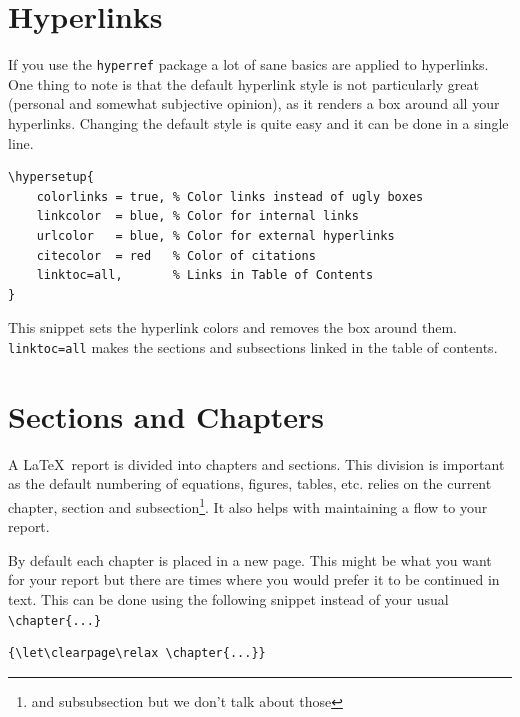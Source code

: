 \documentclass[english,10pt,a4paper, openany, oneside]{book}
\begin{document}
		\section{Hyperlinks}
		\begingroup
		If you use the \texttt{hyperref} package a lot of sane basics are applied to hyperlinks. One thing to note is that the default hyperlink style is not particularly great (personal and somewhat subjective opinion), as it renders a box around all your hyperlinks. Changing the default style is quite easy and it can be done in a single line. 
		\endgroup
		\begin{lstlisting}[style=mystyle]
\hypersetup{
	colorlinks = true, % Color links instead of ugly boxes
	linkcolor  = blue, % Color for internal links
	urlcolor   = blue, % Color for external hyperlinks
	citecolor  = red   % Color of citations
	linktoc=all,       % Links in Table of Contents
}\end{lstlisting}
		This snippet sets the hyperlink colors and removes the box around them. \texttt{linktoc=all} makes the sections and subsections linked in the table of contents.
		
	\section{Sections and Chapters}
		A \LaTeX\ report is divided into chapters and sections. This division is important as the default numbering of equations, figures, tables, etc. relies on the current chapter, section and subsection\footnote{and subsubsection but we don't talk about those}. It also helps with maintaining a flow to your report. 
		
		By default each chapter is placed in a new page. This might be what you want for your report but there are times where you would prefer it to be continued in text. This can be done using the following snippet instead of your usual \lstinline[style=mystyle]|\chapter{...}|
		\begin{lstlisting}[style=mystyle]
{\let\clearpage\relax \chapter{...}}\end{lstlisting}
		
		
\end{document}
